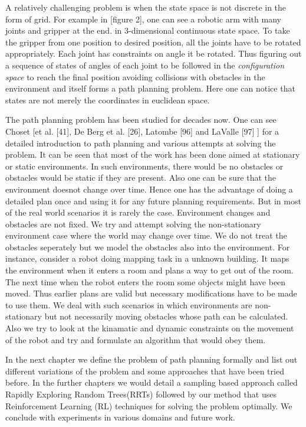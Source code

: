 \documentclass[MTech]{iitmdiss}
\begin{document}
 A relatively challenging problem is when the state space is not discrete in the form of grid. For example in [figure 2], one can see a robotic arm with many joints and gripper at the end. in 3-dimensional continuous state space. To take the gripper from one position to desired position, all the joints have to be rotated appropriately. Each joint has constraints on angle it be rotated. Thus figuring out a sequence of states of angles of each joint to be followed  in the \textit{configuration space} to reach the final position avoiding collisions with obstacles in the environment and itself forms a path planning problem. Here one can notice that states are not merely the coordinates in euclidean space.

The path planning problem has been studied for decades now. One can see Choset  [et al. [41], De Berg et al. [26], Latombe [96] and LaValle [97] ] for a detailed introduction to path planning and various attempts at solving the problem. It can be seen that most of the work has been done aimed at stationary or static environments. In such environments, there would  be no obstacles or obstacles would be static if they are present. Also one can be sure that the environment doesnot change over time. Hence one has the advantage of doing a detailed plan once and using it for any future planning requirements. But in most of the real world scenarios it is rarely the case. Environment changes and obstacles are not fixed. We try and attempt solving the non-stationary environment case where the world may change over time. We do not treat the obstacles seperately but we model the obstacles also into the environment. For instance, consider a robot doing mapping task in a unknown building. It maps the environment when it enters a room and plans a way to get out of the room. The next time when the robot enters the room some objects might have been moved. Thus earlier plans are valid but necessary modifications have to be made to use them. We deal with such scenarios in which environments are non-stationary but not necessarily moving obstacles whose path can be calculated. Also we try to look at the kinamatic and dynamic constraints on the movement of the robot and try and formulate an algorithm that would obey them.

In the next chapter we define the problem of path planning formally and list out different variations of the problem and some approaches that have been tried before. In the further chapters we would detail a sampling based approach called Rapidly Exploring Random Trees(RRTs) followed by our method that uses Reinforcement Learning (RL) techniques for solving the problem optimally. We conclude with experiments in various domains and future work.
\end{document}
